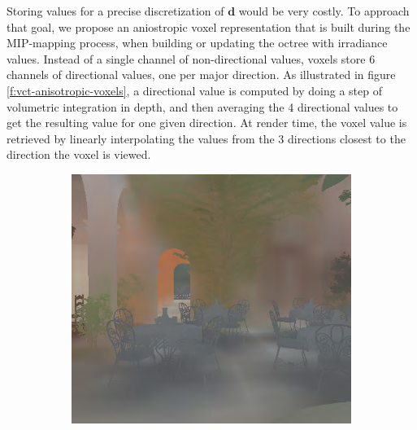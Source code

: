 Storing values for a precise discretization of $\mathbf{d}$ would be very costly. To approach that goal, we propose an aniostropic voxel representation that is built during the MIP-mapping process, when building or updating the octree with irradiance values. Instead of a single channel of non-directional values, voxels store 6 channels of directional values, one per major direction. As illustrated in figure \ref{f:vct-anisotropic-voxels}, a directional value is computed by doing a step of volumetric integration in depth, and then averaging the 4 directional values to get the resulting value for one given direction. At render time, the voxel value is retrieved by linearly interpolating the values from the 3 directions closest to the direction the voxel is viewed. 

\begin{figure}\label{f:vct-anisotropic-voxels-2}
	\begin{subfigure}[b]{0.5\textwidth}
		\includegraphics{graphics/vct/vct-12-1}
	\end{subfigure}
	\begin{subfigure}[b]{0.5\textwidth}

\end{subfigure}
\end{figure}
